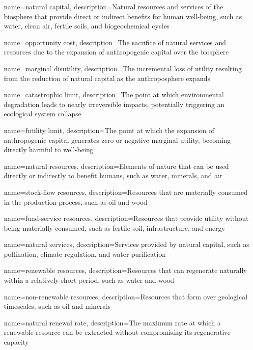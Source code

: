 {
	name=natural capital,
	description={Natural resources and services of the biosphere that provide direct or indirect benefits for human well-being, such as water, clean air, fertile soils, and biogeochemical cycles}
}

{
	name=opportunity cost,
	description={The sacrifice of natural services and resources due to the expansion of anthropogenic capital over the biosphere}
}

{
	name=marginal disutility,
	description={The incremental loss of utility resulting from the reduction of natural capital as the anthroposphere expands}
}

{
	name=catastrophic limit,
	description={The point at which environmental degradation leads to nearly irreversible impacts, potentially triggering an ecological system collapse}
}

{
	name=futility limit,
	description={The point at which the expansion of anthropogenic capital generates zero or negative marginal utility, becoming directly harmful to well-being}
}

{
	name=natural resources,
	description={Elements of nature that can be used directly or indirectly to benefit humans, such as water, minerals, and air}
}

{
	name=stock-flow resources,
	description={Resources that are materially consumed in the production process, such as oil and wood}
}

{
	name=fund-service resources,
	description={Resources that provide utility without being materially consumed, such as fertile soil, infrastructure, and energy}
}

{
	name=natural services,
	description={Services provided by natural capital, such as pollination, climate regulation, and water purification}
}

{
	name=renewable resources,
	description={Resources that can regenerate naturally within a relatively short period, such as water and wood}
}

{
	name=non-renewable resources,
	description={Resources that form over geological timescales, such as oil and minerals}
}

{
	name=natural renewal rate,
	description={The maximum rate at which a renewable resource can be extracted without compromising its regenerative capacity}
}

